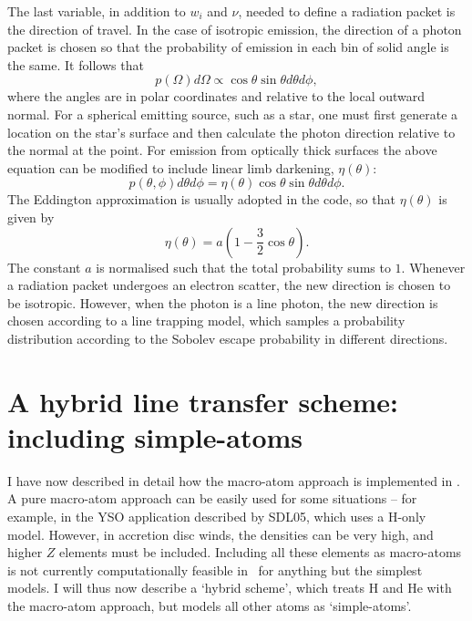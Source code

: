 The last variable, in addition to $w_i$ and $\nu$, needed to define a 
radiation packet is the direction of travel.
In the case of isotropic emission, the direction of a photon packet
is chosen so that the probability of emission in each bin of solid
angle is the same. It follows that 
\begin{equation}
p(\Omega)d\Omega \propto \cos \theta \sin \theta d\theta d\phi,
\end{equation}
where the angles are in polar coordinates and relative to the local
outward normal. For a spherical emitting source, such as 
a star, one must first generate a location on the star's surface
and then calculate the photon direction relative to the normal at the point.
For emission from optically thick surfaces the above equation can be modified
to include linear limb darkening, $\eta(\theta)$:
\begin{equation}
p(\theta, \phi) d\theta d\phi = \eta(\theta) \cos \theta \sin \theta d\theta d\phi.
\end{equation}
The Eddington approximation is usually adopted in the code, so that $\eta(\theta)$
is given by
\begin{equation}
\eta(\theta) = a (1 - \frac{3}{2} \cos \theta).
\end{equation}
The constant $a$ is normalised such that the total probability
sums to $1$. Whenever a radiation packet undergoes an electron scatter,
the new direction is chosen to be isotropic. However,
when the photon is a line photon, the new direction is chosen
according to a line trapping model, which samples a probability 
distribution according to the Sobolev escape probability in different 
directions.






\section{A hybrid line transfer scheme: including simple-atoms}

I have now described in detail how the macro-atom approach is 
implemented in \py. A pure macro-atom approach can be easily used for
some situations -- for example, in the YSO application described by 
SDL05, which uses a H-only model. However, in accretion
disc winds, the densities can be very high, and higher $Z$ elements must be 
included. Including all these elements as macro-atoms is not
currently computationally feasible in \py\ for anything but the simplest
models. I will thus now describe a `hybrid scheme', which treats H and He
with the macro-atom approach, but models all other atoms 
as `simple-atoms'. 

